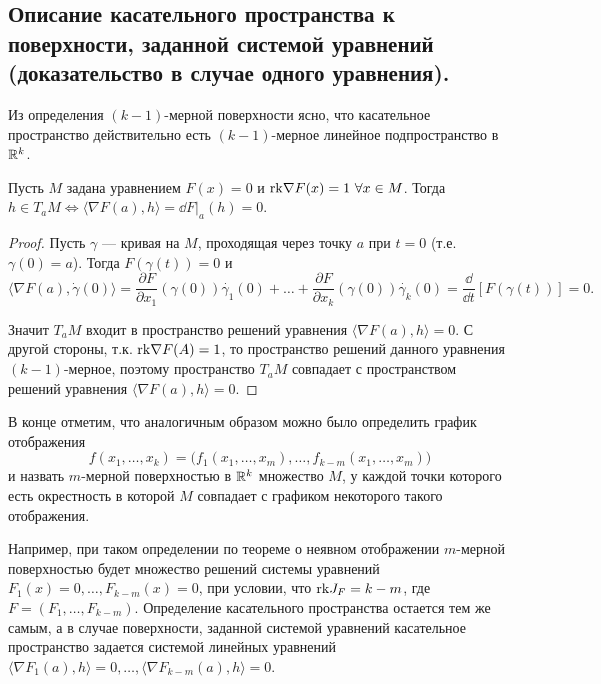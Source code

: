 \documentclass[a4paper]{article}
\theoremstyle{named}
\begin{document}
    \subsection{Описание касательного пространства к поверхности, заданной системой уравнений (доказательство в случае одного уравнения).}
    
    Из определения $(k-1)$-мерной поверхности ясно, что касательное пространство действительно есть $(k-1)$-мерное линейное подпространство в $\mathbb{R}^k$.
    
    \begin{proposal*}
        Пусть $M$ задана уравнением	$F (x) = 0$ и ${\rm rk}\nabla F(x) = 1\ \forall x \in M$. 
        Тогда $h \in T_aM \Leftrightarrow \langle \nabla F(a), h \rangle = \dd F\bigl|_a(h)=0$.
    \end{proposal*}
    
    \begin{proof}
        Пусть $\gamma$ --- кривая на $M$, проходящая через точку $a$ при $t=0$ (т.е. $\gamma(0) = a$).
        Тогда $F(\gamma(t))=0$ и
        $$
            \langle\nabla F(a), \dot{\gamma}(0)\rangle=
            \dfrac{\partial F}{\partial x_1}(\gamma(0))\dot{\gamma_1}(0)
            +\ldots+
            \dfrac{\partial F}{\partial x_k}(\gamma(0))\dot{\gamma_k}(0)=
            \dfrac{\dd}{\dd t}[F(\gamma(t))]=0.
        $$
    
        Значит $T_aM$ входит в пространство решений уравнения $\langle\nabla F(a),h\rangle=0$.
        С другой стороны, т.к. ${\rm rk}\nabla F(A)=1$,	то пространство решений данного уравнения $(k-1)$-мерное, поэтому пространство $T_aM$ совпадает с пространством решений уравнения $\langle\nabla F(a),h\rangle=0$.
    \end{proof}

    В конце отметим, что аналогичным образом можно было определить график отображения $$f(x_1,\ldots,x_k) = \bigl(f_1(x_1,\ldots, x_m),\ldots, f_{k-m}(x_1,\ldots, x_m)\bigr)$$ и назвать $m$-мерной поверхностью в $\mathbb{R}^k$ множество $M$, у каждой точки которого есть окрестность в которой $M$ совпадает с графиком некоторого такого отображения.
    
    Например, при таком определении по теореме о неявном отображении $m$-мерной поверхностью будет множество решений системы уравнений $F_1(x)=0,\ldots, F_{k-m}(x)=0$, при условии, что ${\rm rk}J_F=k-m$, где $F=(F_1,\ldots, F_{k-m})$.
    Определение касательного пространства остается тем же самым, а в случае поверхности, заданной системой уравнений касательное пространство задается системой линейных уравнений $\langle\nabla F_1(a), h\rangle=0,\ldots, \langle\nabla F_{k-m}(a), h\rangle=0$.
\end{document}
